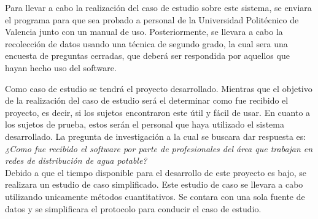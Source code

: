 \documentclass[11pt,letterpaper]{article}
\begin{document}
Para llevar a cabo la realización del caso de estudio sobre este sistema, se enviara el programa para que sea probado a personal de la Universidad Politécnico de Valencia junto con un manual de uso. Posteriormente, se llevara a cabo la recolección de datos usando una técnica de segundo grado, la cual sera una encuesta de preguntas cerradas, que deberá ser respondida por aquellos que hayan hecho uso del software.

Como caso de estudio se tendrá el proyecto desarrollado. Mientras que el objetivo de la realización del caso de estudio será el determinar como fue recibido el proyecto, es decir, si los sujetos encontraron este útil y fácil de usar. En cuanto a los sujetos de prueba, estos serán el personal que haya utilizado el sistema desarrollado. La pregunta de investigación a la cual se buscara dar respuesta es:\\

\textit{¿Como fue recibido el software por parte de profesionales del área que trabajan en redes de distribución de agua potable?}\\

Debido a que el tiempo disponible para el desarrollo de este proyecto es bajo, se realizara un estudio de caso simplificado. Este estudio de caso se llevara a cabo utilizando unicamente métodos cuantitativos. Se contara con una sola fuente de datos y se simplificara el protocolo para conducir el caso de estudio.



%
\end{document}
